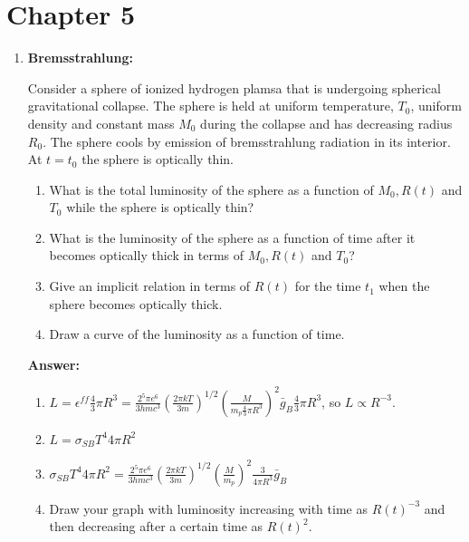 \documentclass{article}
\begin{document}
\fi
\section{Chapter 5}
\begin{enumerate}
\item{\bf Bremsstrahlung:}

Consider a sphere of ionized hydrogen plamsa that is undergoing
spherical gravitational collapse.  The sphere is held at uniform
temperature, $T_0$, uniform density and constant mass $M_0$ during the
collapse and has decreasing radius $R_0$.  The sphere cools by
emission of bremsstrahlung radiation in its interior.  At $t=t_0$ the
sphere is optically thin.
\begin{enumerate}
\item What is the total luminosity of the sphere as a function of
  $M_0, R(t)$ and $T_0$ while the sphere is optically thin?
\item
What is the luminosity of the sphere as a function of time after it
becomes optically thick in terms of $M_0, R(t)$ and $T_0$?
\item
Give an implicit relation in terms of $R(t)$ for the time $t_1$ when
the sphere becomes optically thick.
\item
Draw a curve of the luminosity as a function of time.
\end{enumerate}

{\bf Answer:}

\begin{enumerate}
\item 
$L = \epsilon^{ff} \frac{4}{3} \pi R^3 = \frac{2^5 \pi
  e^6}{3 h m c^3} \left ( \frac{2\pi k T}{3m} \right )^{1/2}
  \left (\frac{M}{m_p \frac{4}{3} \pi R^3} \right)^2 {\bar g}_{B} \frac{4}{3} \pi R^3
$, so $L \propto R^{-3}$.
\item
$L=\sigma_{SB} T^4 4 \pi R^2$
\item
$
\sigma_{SB} T^4 4 \pi R^2 = \frac{2^5 \pi
  e^6}{3 h m c^3} \left ( \frac{2\pi k T}{3m} \right )^{1/2}
  \left (\frac{M}{m_p}\right)^2  \frac{3}{4 \pi R^3} {\bar g}_{B}
$
\item
Draw your graph with luminosity increasing with time as $R(t)^{-3}$
and then decreasing after a certain time as $R(t)^2$.
\end{enumerate}
\end{enumerate}
\ifx\bookloaded\undefined
\end{document}
